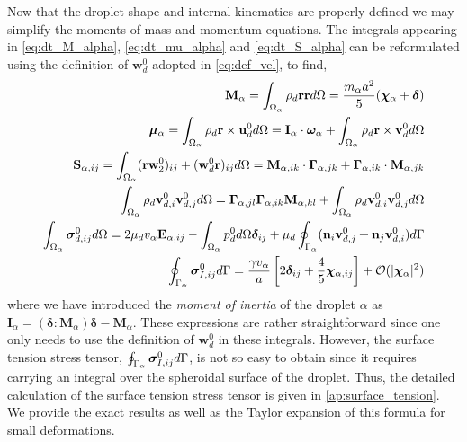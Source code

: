 Now that the droplet shape and internal kinematics are properly defined we may simplify the moments of mass and momentum equations. 
The integrals appearing in \ref{eq:dt_M_alpha}, \ref{eq:dt_mu_alpha} and \ref{eq:dt_S_alpha} can be reformulated using the definition of $\textbf{w}_d^0$ adopted in \ref{eq:def_vel}, to find, 
\begin{align}
    \textbf{M}_\alpha 
    = \intO{ \rho_d \textbf{rr} }
    = \frac{m_\alpha a^2}{5} (\bm\chi_\alpha+\bm\delta)\\
    \bm\mu_\alpha 
    = \intO{ \rho_d \textbf{r}\times\textbf{u}_d^0 }
    = \textbf{I}_\alpha \cdot \bm\omega_\alpha
    + \intO{ \rho_d \textbf{r}\times\textbf{v}_d^0 }
    \\
    \label{eq:S_def}
    \textbf{S}_{\alpha,ij} = \intO{(\textbf{rw}_ 2^0 )_{ij}+ (\textbf{w}_d^0 \textbf{r})_{ij}} 
    = \textbf{M}_{\alpha,ik} \cdot \bm\Gamma_{\alpha,jk}
        +  \bm\Gamma_{\alpha,ik} \cdot \textbf{M}_{\alpha,jk}
    \\
    \intO{\rho_d \textbf{v}_{d,i}^0\textbf{v}_{d,j}^0}
    = \bm\Gamma_{\alpha,jl}\bm\Gamma_{\alpha,ik} \textbf{M}_{\alpha,kl}  
    +\intO{\rho_d \textbf{v}_{d,i}^0\textbf{v}_{d,j}^0}
    \label{eq:ww_def}
    \\
    \label{eq:sigma_d_def}
    \intO{\bm\sigma_{d,ij}^0}
    =
    2 \mu_d v_\alpha \textbf{E}_{\alpha,ij}
    - \intO{p_d^0} \bm\delta_{ij}
    + \mu_d \intS{(\textbf{n}_i \textbf{v}_{d,j}^0 + \textbf{n}_j \textbf{v}_{d,i}^0)}
    \\
    \intS{\bm\sigma_{I,ij}^0}
    = \frac{\gamma v_\alpha }{a} \left[
        2\bm\delta_{ij} 
        + \frac{4  }{5} \bm\chi_{\alpha,ij}
    \right]
    +\mathcal{O}(|\bm\chi_\alpha|^2)
\end{align}
where we have introduced the \textit{moment of inertia} of the droplet $\alpha$ as $\textbf{I}_\alpha = (\bm\delta : \textbf{M}_\alpha)\bm\delta - \textbf{M}_\alpha$. 
These expressions are rather straightforward since one only needs to use the definition of $\textbf{w}_d^0$ in these integrals. 
However, the surface tension stress tensor, $\oint_{\Gamma_{\alpha}} \bm\sigma_{I,ij}^0 d\Gamma$, is not so easy to obtain since it requires carrying an integral over the spheroidal surface of the droplet.
Thus, the detailed calculation of the surface tension stress tensor is given in \ref{ap:surface_tension}. 
We provide the exact results as well as the Taylor expansion of this formula for small deformations. 

